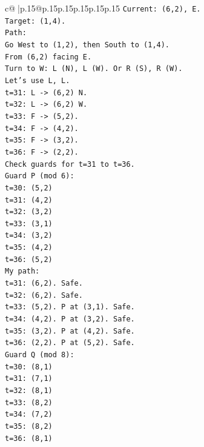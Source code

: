 \documentclass{article}
\begin{document}
{\begin{supertabular}{c@{$\;$}|p{.15\linewidth}@{}p{.15\linewidth}p{.15\linewidth}p{.15\linewidth}p{.15\linewidth}p{.15\linewidth}}
{{{\texttt{Current: (6,2), E.} \\
\texttt{Target: (1,4).} \\
\texttt{Path:} \\
\texttt{Go West to (1,2), then South to (1,4).} \\
\texttt{From (6,2) facing E.} \\
\texttt{Turn to W: L (N), L (W). Or R (S), R (W).} \\
\texttt{Let's use L, L.} \\
\texttt{t=31: L {-}> (6,2) N.} \\
\texttt{t=32: L {-}> (6,2) W.} \\
\texttt{t=33: F {-}> (5,2).} \\
\texttt{t=34: F {-}> (4,2).} \\
\texttt{t=35: F {-}> (3,2).} \\
\texttt{t=36: F {-}> (2,2).} \\
\texttt{Check guards for t=31 to t=36.} \\
\texttt{Guard P (mod 6):} \\
\texttt{t=30: (5,2)} \\
\texttt{t=31: (4,2)} \\
\texttt{t=32: (3,2)} \\
\texttt{t=33: (3,1)} \\
\texttt{t=34: (3,2)} \\
\texttt{t=35: (4,2)} \\
\texttt{t=36: (5,2)} \\
\texttt{My path:} \\
\texttt{t=31: (6,2). Safe.} \\
\texttt{t=32: (6,2). Safe.} \\
\texttt{t=33: (5,2). P at (3,1). Safe.} \\
\texttt{t=34: (4,2). P at (3,2). Safe.} \\
\texttt{t=35: (3,2). P at (4,2). Safe.} \\
\texttt{t=36: (2,2). P at (5,2). Safe.} \\
\texttt{Guard Q (mod 8):} \\
\texttt{t=30: (8,1)} \\
\texttt{t=31: (7,1)} \\
\texttt{t=32: (8,1)} \\
\texttt{t=33: (8,2)} \\
\texttt{t=34: (7,2)} \\
\texttt{t=35: (8,2)} \\
\texttt{t=36: (8,1)} \\
}}}
\end{supertabular}}
\end{document}
